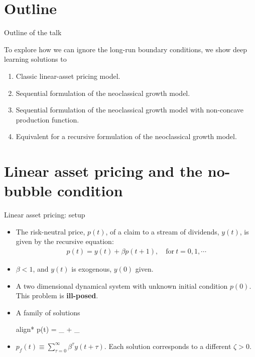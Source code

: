 \documentclass[aspectratio=169,10pt]{beamer}
\newcommand{\emphcolor}[1]{\textbf{\textcolor{emphcolorval}{#1}}}
\begin{document}
\section{Outline}

\begin{frame}{Outline of the talk}
	
	To explore how we can ignore the long-run boundary conditions, we show deep learning solutions to
	\begin{enumerate}
		\item Classic linear-asset pricing model.\vspace{0.1in}
		\item Sequential formulation of the neoclassical growth model.\vspace{0.1in}
		\item Sequential formulation of the neoclassical growth model with non-concave production function.\vspace{0.1in}
		\item Equivalent for a recursive formulation of the neoclassical growth model.\vspace{0.1in}
		
	\end{enumerate}
\end{frame}

\section{\textcolor{KahouBlack}{Linear asset pricing and the no-bubble condition}}

\begin{frame}{Linear asset pricing: setup }
	\begin{itemize}
	\item The risk-neutral price, $p(t)$, of a claim to a stream of dividends, $y(t)$, is given by
	the recursive equation:
	\begin{align*}
		p(t) = y(t) + \beta p(t+1), \quad \text{for}~ t=0,1,\cdots
	\end{align*}
	\item $\beta<1$, and $y(t)$ is exogenous, $y(0)$ given.
	\item A two dimensional dynamical system with unknown initial condition  $p(0)$. This problem is \emphcolor{ill-posed}.
	\item A family of solutions
	 \begin{empheq}[box=\tcbhighmath]{align*}
	 	p(t) = _{} +  _{}
	 \end{empheq}
	 \item $p_f(t) \equiv \sum_{\tau =0}^\infty \beta^\tau y(t+\tau)$. Each solution corresponds to a different $\zeta>0$.
	\end{itemize}
\end{frame}
\end{document}
